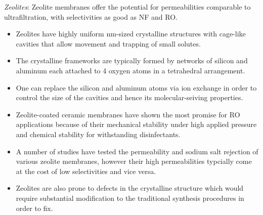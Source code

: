   \textit{Zeolites}: Zeolite membranes offer the potential for permeabilities comparable to ultrafiltration, 
  with selectivities as good as NF and RO.~\cite{hoek_nanotechnology-based_2014}
  \begin{itemize}  
    \item Zeolites have highly uniform nm-sized crystalline structures with cage-like
    cavities that allow movement and trapping of small solutes. 
    \item The crystalline frameworks are typically formed by networks of silicon 
    and aluminum each attached to 4 oxygen atoms in a tetrahedral arrangement.~\cite{auerbach_handbook_2003}
    \item One can replace the silicon and aluminum atoms via ion exchange in order
    to control the size of the cavities and hence its molecular-seiving properties.~\cite{li_novel_2007}
    \item Zeolite-coated ceramic membranes have shown the most promise for RO applications
    because of their mechanical stability under high applied pressure and chemical
    stability for withstanding disinfectants.~\cite{pendergast_review_2011}
    \item A number of studies have tested the permeability and sodium salt rejection
    of various zeolite membranes, however their high permeabilities typcially come
    at the cost of low selectivities and vice versa.~\cite{li_desalination_2004,duke_seawater_2009}
    \item Zeolites are also prone to defects in the crystalline structure which 
    would require substantial modification to the traditional synthesis procedures
    in order to fix.~\cite{kumakiri_application_2000}
  \end{itemize}

